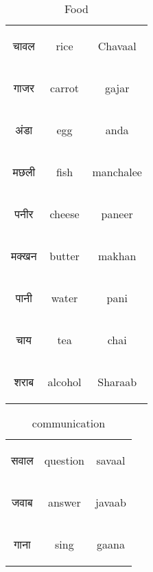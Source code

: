 \begin{table}[H]
\begin{tabular}{c|c|c}
        \begin{hindi} चावल \end{hindi} & rice & Chavaal \\
        \begin{hindi} गाजर \end{hindi} & carrot & gajar \\ 
        \begin{hindi} अंडा \end{hindi} & egg & anda \\
        \begin{hindi} मछली \end{hindi} & fish & manchalee \\  
        \begin{hindi} पनीर \end{hindi} & cheese & paneer \\  
        \begin{hindi} मक्खन \end{hindi} & butter & makhan \\  
        \begin{hindi} पानी \end{hindi} & water & pani \\
        \begin{hindi} चाय \end{hindi} & tea & chai \\
        \begin{hindi} शराब \end{hindi} & alcohol & Sharaab \\

    \end{tabular}
    \caption{Food}
    \label{tab:nouns_food}
\end{table}

\begin{table}[H]
    \centering
    \begin{tabular}{c|c|c}
        \begin{hindi} सवाल \end{hindi} & question & savaal \\
        \begin{hindi} जवाब \end{hindi} & answer & javaab \\ 
        \begin{hindi}गाना \end{hindi} & sing & gaana \\ 
    \end{tabular}
    \caption{communication}
    \label{tab:nouns_communication}
\end{table}

